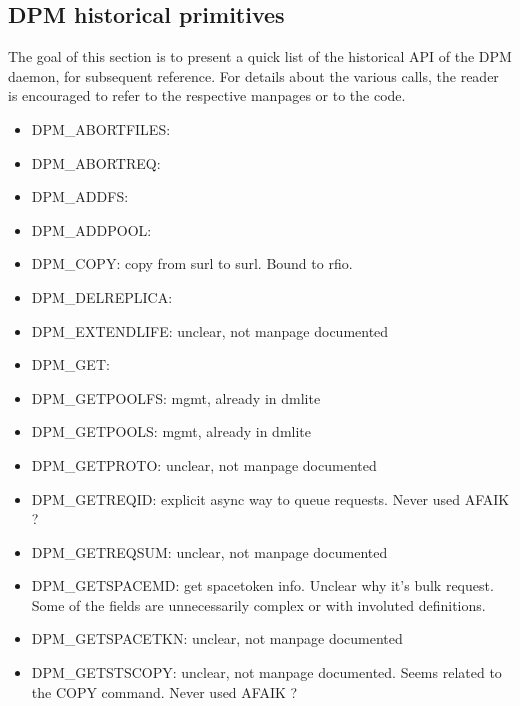 \documentclass[a4paper,10pt]{scrreprt}
\begin{document}
\subsection{DPM historical primitives}
 The goal of this section is to present a quick list of the historical API of the DPM daemon, for subsequent reference.
 For details about the various calls, the reader is encouraged to refer to the respective manpages or to the code.


\begin{itemize}
\item DPM\_ABORTFILES:

\item DPM\_ABORTREQ:

\item DPM\_ADDFS:

\item DPM\_ADDPOOL:

\item DPM\_COPY: copy from surl to surl. Bound to rfio.

\item DPM\_DELREPLICA:

\item DPM\_EXTENDLIFE: unclear, not manpage documented

\item DPM\_GET:

\item DPM\_GETPOOLFS: mgmt, already in dmlite

\item DPM\_GETPOOLS: mgmt, already in dmlite

\item DPM\_GETPROTO: unclear, not manpage documented

\item DPM\_GETREQID: explicit async way to queue requests. Never used AFAIK ?

\item DPM\_GETREQSUM:  unclear, not manpage documented

\item DPM\_GETSPACEMD: get spacetoken info. Unclear why it's bulk request. Some of the fields are unnecessarily complex or with involuted definitions.

\item DPM\_GETSPACETKN: unclear, not manpage documented

\item DPM\_GETSTSCOPY:  unclear, not manpage documented. Seems related to the COPY command. Never used AFAIK ?


\end{itemize}
\end{document}
